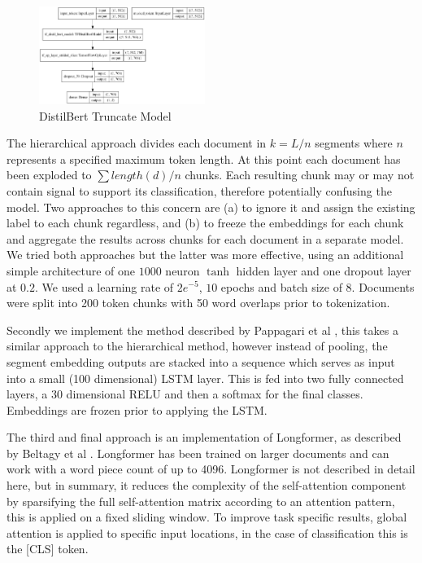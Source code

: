 \documentclass[twocolumn,10pt]{wmrDoc}
\begin{document}
\begin{figure}[h]
    \centering
    \includegraphics[width=0.48\textwidth]{images/DistilBert_TF.png}
    \caption{DistilBert Truncate Model}
    \label{fig:DistilBert}
\end{figure}

The hierarchical approach divides each document in $k = L/n$ segments where $n$ represents a specified maximum token length. At this point each document has been exploded to $\sum length(d)/n$ chunks.  Each resulting chunk may or may not contain signal to support its classification, therefore potentially confusing the model.  Two approaches to this concern are (a) to ignore it and assign the existing label to each chunk regardless, and (b) to freeze the embeddings for each chunk and aggregate the results across chunks for each document in a separate model. We tried both approaches but the latter was more effective, using an additional simple architecture of one $1000$ neuron $\tanh$ hidden layer and one dropout layer at $0.2$. We used a learning rate of $2e^{-5}$, $10$ epochs and batch size of $8$. Documents were split into 200 token chunks with 50 word overlaps prior to tokenization.  

Secondly we implement the method described by Pappagari et al \cite{Pappagari}, this takes a similar approach to the hierarchical method, however instead of pooling, the segment embedding outputs are stacked into a sequence which serves as input into a small (100 dimensional) LSTM layer. This is fed into two fully connected layers, a 30 dimensional RELU and then a softmax for the final classes. Embeddings are frozen prior to applying the LSTM.

The third and final approach is an implementation of Longformer, as described by Beltagy et al \cite{longformer}. Longformer has been trained on larger documents and can work with a word piece count of up to 4096. Longformer is not described in detail here, but in summary, it reduces the complexity of the self-attention component by sparsifying the full self-attention matrix according to an attention pattern, this is applied on a fixed sliding window. To improve task specific results, global attention is applied to specific input locations, in the case of classification this is the [CLS] token.
\end{document}
